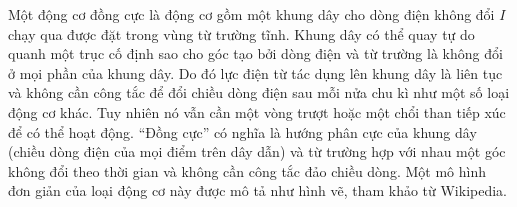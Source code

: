 \begin{vd}
  Một động cơ đồng cực là động cơ gồm một khung dây cho dòng điện không đổi $I$ chạy qua được đặt trong vùng từ trường tĩnh. Khung dây có thể quay tự do quanh một trục cố định sao cho góc tạo bởi dòng điện và từ trường là không đổi ở mọi phần của khung dây. Do đó lực điện từ tác dụng lên khung dây là liên tục và không cần công tắc để đổi chiều dòng điện sau mỗi nửa chu kì như một số loại động cơ khác. Tuy nhiên nó vẫn cần một vòng trượt hoặc một chổi than tiếp xúc để có thể hoạt động. “Đồng cực” có nghĩa là hướng phân cực của khung dây (chiều dòng điện của mọi điểm trên dây dẫn) và từ trường hợp với nhau một góc không đổi theo thời gian và không cần công tắc đảo chiều dòng. Một mô hình đơn giản của loại động cơ này được mô tả như hình vẽ, tham khảo từ Wikipedia.
  \begin{center}

\begin{tikzpicture}[x=0.75pt,y=0.75pt,yscale=-1,xscale=1]


\end{tikzpicture}
\end{center}
\end{vd}
